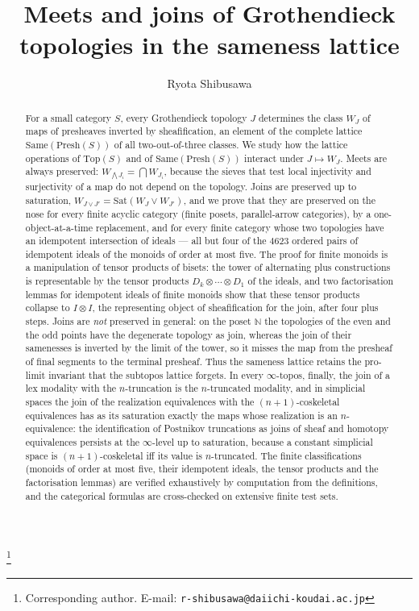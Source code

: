 \documentclass[11pt]{amsart}
\theoremstyle{definition}
\newcommand{\Same}{\mathrm{Same}}
\newcommand{\Top}{\mathrm{Top}}
\newcommand{\Presh}{\mathrm{Presh}}
\newcommand{\Sat}{\mathrm{Sat}}
\begin{document}
\title[Meets and joins of topologies in the sameness lattice]{Meets and joins of
  Grothendieck topologies in the sameness lattice}
\author{Ryota Shibusawa}
\thanks{Corresponding author. E-mail: \texttt{r-shibusawa@daiichi-koudai.ac.jp}}
\address{Daiichi Institute of Technology}

\begin{abstract}
For a small category $S$, every Grothendieck topology $J$ determines the class
$W_J$ of maps of presheaves inverted by sheafification, an element of the
complete lattice $\Same(\Presh(S))$ of all two-out-of-three classes. We study
how the lattice operations of $\Top(S)$ and of $\Same(\Presh(S))$ interact
under $J\mapsto W_J$. Meets are always preserved: $W_{\bigwedge J_i}=\bigcap
W_{J_i}$, because the sieves that test local injectivity and surjectivity of a
map do not depend on the topology. Joins are preserved up to saturation,
$W_{J\vee J'}=\Sat(W_J\vee W_{J'})$, and we prove that they are preserved on
the nose for every finite acyclic category (finite posets, parallel-arrow
categories), by a one-object-at-a-time replacement, and for every finite
category whose two topologies have an idempotent intersection of ideals ---
all but four of the $4623$ ordered pairs of idempotent ideals of the monoids
of order at most five. The proof for finite monoids is a
manipulation of tensor products of bisets: the tower of alternating plus
constructions is representable by the tensor products $D_k\otimes\cdots\otimes D_1$
of the ideals, and two factorisation lemmas for idempotent ideals of finite
monoids show that these tensor products collapse to $I\otimes I$, the
representing object of sheafification for the join, after four plus steps. Joins
are \emph{not} preserved in general: on the poset $\mathbb N$ the topologies of
the even and the odd points have the degenerate topology as join, whereas the
join of their samenesses is inverted by the limit of the tower, so it misses
the map from the presheaf of final segments to the terminal presheaf. Thus the
sameness lattice retains the pro-limit invariant that the subtopos lattice
forgets. In every $\infty$-topos, finally, the join of a lex modality with the
$n$-truncation is the $n$-truncated modality, and in simplicial spaces the
join of the realization equivalences with the $(n{+}1)$-coskeletal
equivalences has as its saturation exactly the maps whose realization is an
$n$-equivalence: the identification of Postnikov truncations as joins of
sheaf and homotopy equivalences persists at the $\infty$-level up to
saturation, because a constant simplicial space is $(n{+}1)$-coskeletal iff
its value is $n$-truncated. The finite classifications (monoids of order at most five, their idempotent
ideals, the tensor products and the factorisation lemmas) are verified
exhaustively by computation from the definitions, and the categorical
formulas are cross-checked on extensive finite test sets.
\end{abstract}
\end{document}
